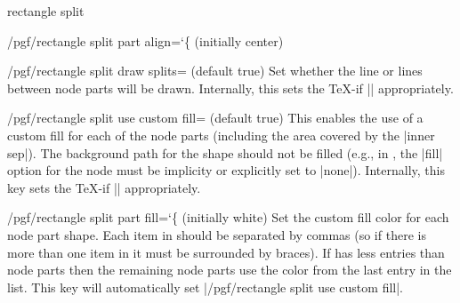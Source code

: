 \begin{shape}{rectangle split}
\begin{key}{/pgf/rectangle split part align={\ttfamily\char`\{} (initially center)}
\begin{codeexample}[]
\def\x{\Large w\nodepart{two}x\nodepart{three}\Huge y\nodepart{four}\tiny z}
\end{codeexample}

  \end{key}
   
  \begin{key}{/pgf/rectangle split draw splits= (default true)}
  	Set whether the line or lines between node parts will be drawn.
  	Internally, this sets the \TeX-if |\ifpgfrectanglesplitdrawsplits| 
  	appropriately.
  \end{key}
  
  \begin{key}{/pgf/rectangle split use custom fill= (default true)}
    This enables the use of a custom fill for each of the node
    parts (including the area covered by the |inner sep|). The 
    background path for the shape should not be filled (e.g., in
    \tikzname{}, the |fill|
    option for the node must be implicity or explicitly set to |none|).
    Internally, this key sets the \TeX-if 
    |\ifpgfrectanglesplitusecustomfill| appropriately.
  \end{key}
  
  \begin{key}{/pgf/rectangle split part fill={\ttfamily\char`\{} (initially white)}
  	Set the custom fill color for each node part shape. 
  	Each item in  should be separated by commas (so if 
  	there is more than one item in  it must be surrounded 
  	by braces).
  	If   has less entries than node
    parts then the remaining node parts use the color from
    the last entry in the list. This key will automatically set
    |/pgf/rectangle split use custom fill|.
    
\begin{codeexample}[]
\end{codeexample}


\end{key}
\end{shape}
